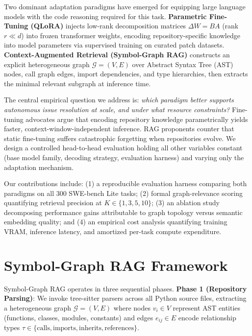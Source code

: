 \documentclass[10pt,twocolumn,letterpaper]{article}
\begin{document}
Two dominant adaptation paradigms have emerged for equipping large language models with the code reasoning required for this task. \textbf{Parametric Fine-Tuning (QLoRA)} injects low-rank decomposition matrices $\Delta W = BA$ (rank $r \ll d$) into frozen transformer weights, encoding repository-specific knowledge into model parameters via supervised training on curated patch datasets. \textbf{Context-Augmented Retrieval (Symbol-Graph RAG)} constructs an explicit heterogeneous graph $\mathcal{G} = (V, E)$ over Abstract Syntax Tree (AST) nodes, call graph edges, import dependencies, and type hierarchies, then extracts the minimal relevant subgraph at inference time.

The central empirical question we address is: \textit{which paradigm better supports autonomous issue resolution at scale, and under what resource constraints?} Fine-tuning advocates argue that encoding repository knowledge parametrically yields faster, context-window-independent inference. RAG proponents counter that static fine-tuning suffers catastrophic forgetting when repositories evolve. We design a controlled head-to-head evaluation holding all other variables constant (base model family, decoding strategy, evaluation harness) and varying only the adaptation mechanism.

Our contributions include: (1) a reproducible evaluation harness comparing both paradigms on all 300 SWE-bench Lite tasks; (2) formal graph-relevance scoring quantifying retrieval precision at $K \in \{1,3,5,10\}$; (3) an ablation study decomposing performance gains attributable to graph topology versus semantic embedding quality; and (4) an empirical cost analysis quantifying training VRAM, inference latency, and amortized per-task compute expenditure. \cite{crossref_10_1201_9788743808145_14}




\section{Symbol-Graph RAG Framework}


Symbol-Graph RAG operates in three sequential phases. \textbf{Phase 1 (Repository Parsing)}: We invoke tree-sitter parsers across all Python source files, extracting a heterogeneous graph $\mathcal{G} = (V, E)$ where nodes $v_i \in V$ represent AST entities (functions, classes, modules, constants) and edges $e_{ij} \in E$ encode relationship types $\tau \in \{\text{calls}, \text{imports}, \text{inherits}, \text{references}\}$.
\end{document}
